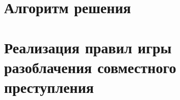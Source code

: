 \chapter{Алгоритм решения}
%
\chapter{Реализация правил игры разоблачения совместного преступления}
%